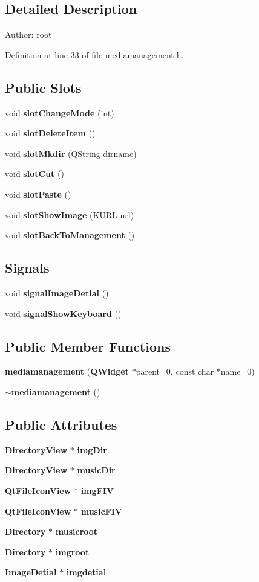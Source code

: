 \subsection{Detailed Description}
\begin{Desc}
\item[Author:]root \end{Desc}




Definition at line 33 of file mediamanagement.h.\subsection*{Public Slots}
\begin{CompactItemize}
\item 
void {\bf slot\-Change\-Mode} (int)
\item 
void {\bf slot\-Delete\-Item} ()
\item 
void {\bf slot\-Mkdir} (QString dirname)
\item 
void {\bf slot\-Cut} ()
\item 
void {\bf slot\-Paste} ()
\item 
void {\bf slot\-Show\-Image} (KURL url)
\item 
void {\bf slot\-Back\-To\-Management} ()
\end{CompactItemize}
\subsection*{Signals}
\begin{CompactItemize}
\item 
void {\bf signal\-Image\-Detial} ()
\item 
void {\bf signal\-Show\-Keyboard} ()
\end{CompactItemize}
\subsection*{Public Member Functions}
\begin{CompactItemize}
\item 
{\bf mediamanagement} ({\bf QWidget} $\ast$parent=0, const char $\ast$name=0)
\item 
{\bf $\sim$mediamanagement} ()
\end{CompactItemize}
\subsection*{Public Attributes}
\begin{CompactItemize}
\item 
{\bf Directory\-View} $\ast$ {\bf img\-Dir}
\item 
{\bf Directory\-View} $\ast$ {\bf music\-Dir}
\item 
{\bf Qt\-File\-Icon\-View} $\ast$ {\bf img\-FIV}
\item 
{\bf Qt\-File\-Icon\-View} $\ast$ {\bf music\-FIV}
\item 
{\bf Directory} $\ast$ {\bf musicroot}
\item 
{\bf Directory} $\ast$ {\bf imgroot}
\item 
{\bf Image\-Detial} $\ast$ {\bf imgdetial}
\end{CompactItemize}
